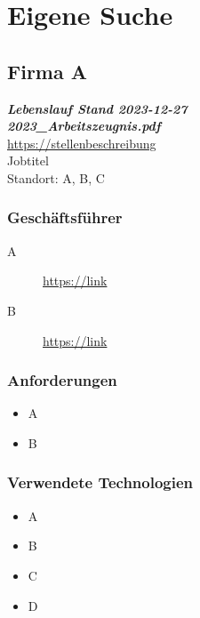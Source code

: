 \documentclass{scrartcl}
\begin{document}
    \section{Eigene Suche}\label{sec:eigene-suche}

    \subsection{Firma A}\label{subsec:firma-a}
    \textbf{\textit{
        Lebenslauf Stand 2023-12-27\\
        2023\_Arbeitszeugnis.pdf
    }}\\
    \url{https://stellenbeschreibung}\\
    Jobtitel\\
    Standort: A, B, C\\

    \subsubsection{Geschäftsführer}\label{subsubsec:geschaftsfuhrer}
    \begin{description}
        \item[A] \url{https://link}
        \item[B] \url{https://link}
    \end{description}

    \subsubsection{Anforderungen}\label{subsubsec:anforderungen}
    \begin{multicols}{2}
        \begin{itemize}
            \item A
            \item B
        \end{itemize}
    \end{multicols}

    \subsubsection{Verwendete Technologien}\label{subsubsec:verwendete-technologien}
    \begin{multicols}{2}
        \begin{itemize}
            \item A
            \item B
            \item C
            \item D
        \end{itemize}
    \end{multicols}
\end{document}
